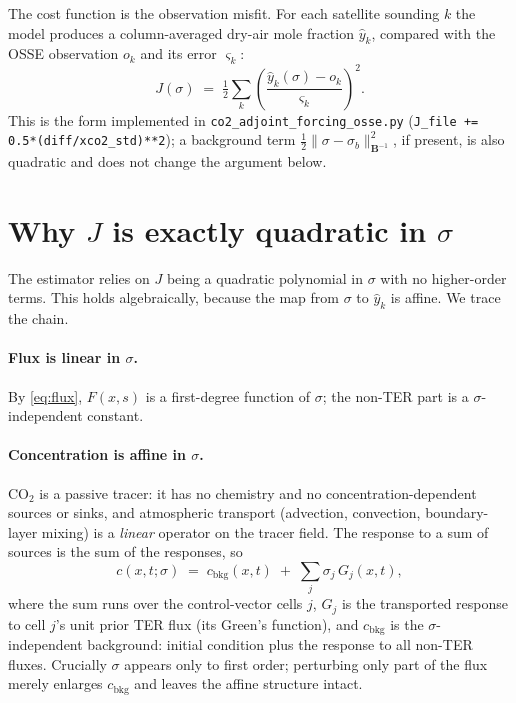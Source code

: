 \documentclass[12pt]{article}
\newcommand{\bm}[1]{\mathbf{#1}}
\begin{document}
The cost function is the observation misfit. For each satellite sounding $k$ the
model produces a column-averaged dry-air mole fraction $\hat{y}_k$, compared with
the OSSE observation $o_k$ and its error $\varsigma_k$:
%
\begin{equation}
  J(\sigma) \;=\; \tfrac{1}{2}\sum_{k}
  \left(\frac{\hat{y}_k(\sigma) - o_k}{\varsigma_k}\right)^{2}.
  \label{eq:J}
\end{equation}
%
This is the form implemented in \texttt{co2\_adjoint\_forcing\_osse.py}
(\texttt{J\_file += 0.5*(diff/xco2\_std)**2}); a background term
$\tfrac12\|\sigma-\sigma_b\|_{\bm{B}^{-1}}^2$, if present, is also quadratic and
does not change the argument below.

\section{Why $J$ is exactly quadratic in $\sigma$}
\label{sec:quad}

The estimator relies on $J$ being a quadratic polynomial in $\sigma$ with no
higher-order terms. This holds algebraically, because the map from $\sigma$ to
$\hat{y}_k$ is affine. We trace the chain.

\paragraph{Flux is linear in $\sigma$.} By \eqref{eq:flux}, $F(x,s)$ is a
first-degree function of $\sigma$; the non-TER part is a $\sigma$-independent
constant.

\paragraph{Concentration is affine in $\sigma$.} CO$_2$ is a passive tracer: it
has no chemistry and no concentration-dependent sources or sinks, and atmospheric
transport (advection, convection, boundary-layer mixing) is a \emph{linear}
operator on the tracer field. The response to a sum of sources is the sum of the
responses, so
%
\begin{equation}
  c(x,t;\sigma) \;=\; c_{\mathrm{bkg}}(x,t) \;+\;
  \sum_{j} \sigma_j\, G_j(x,t),
  \label{eq:superpose}
\end{equation}
%
where the sum runs over the control-vector cells $j$, $G_j$ is the transported
response to cell $j$'s unit prior TER flux (its Green's function), and
$c_{\mathrm{bkg}}$ is the $\sigma$-independent background: initial condition plus
the response to all non-TER fluxes. Crucially $\sigma$ appears only to first
order; perturbing only part of the flux merely enlarges $c_{\mathrm{bkg}}$ and
leaves the affine structure intact.
\end{document}
